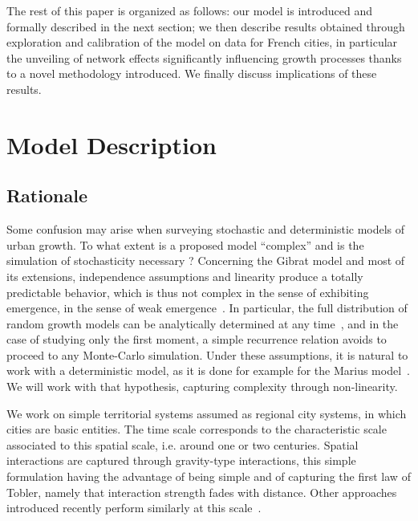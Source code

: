 \documentclass[Royal,sageh,times]{sagej}
\begin{document}
The rest of this paper is organized as follows: our model is introduced and formally described in the next section; we then describe results obtained through exploration and calibration of the model on data for French cities, in particular the unveiling of network effects significantly influencing growth processes thanks to a novel methodology introduced. We finally discuss implications of these results.





\section*{Model Description}




\subsection*{Rationale}


Some confusion may arise when surveying stochastic and deterministic models of urban growth. To what extent is a proposed model ``complex'' and is the simulation of stochasticity necessary ? Concerning the Gibrat model and most of its extensions, independence assumptions and linearity produce a totally predictable behavior, which is thus not complex in the sense of exhibiting emergence, in the sense of weak emergence~\citep{bedau2002downward}. In particular, the full distribution of random growth models can be analytically determined at any time~\citep{gabaix1999zipf}, and in the case of studying only the first moment, a simple recurrence relation avoids to proceed to any Monte-Carlo simulation. Under these assumptions, it is natural to work with a deterministic model, as it is done for example for the Marius model~\citep{cottineau2014evolution}. We will work with that hypothesis, capturing complexity through non-linearity.

We work on simple territorial systems assumed as regional city systems, in which cities are basic entities. The time scale corresponds to the characteristic scale associated to this spatial scale, i.e. around one or two centuries. Spatial interactions are captured through gravity-type interactions, this simple formulation having the advantage of being simple and of capturing the first law of Tobler, namely that interaction strength fades with distance. Other approaches introduced recently perform similarly at this scale~\citep{masucci2013gravity}.
\end{document}
